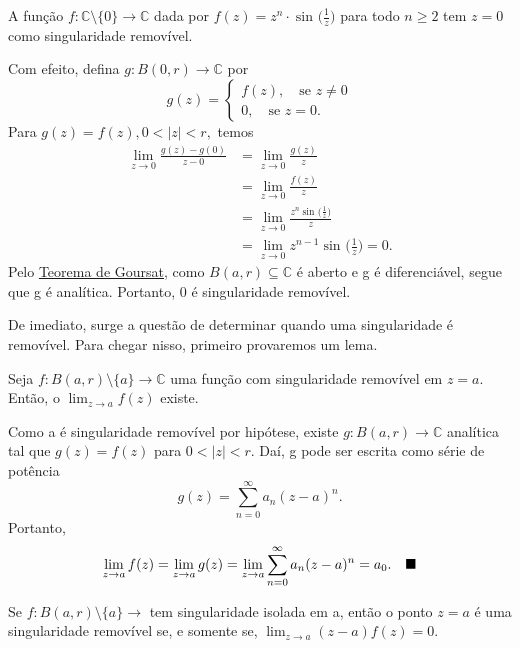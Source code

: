 \documentclass[ComplexAnalysis/complex.tex]{subfiles}
\begin{document}
\begin{example}
	A função \(f:\mathbb{C}\setminus{\{0\}}\rightarrow \mathbb{C}\) dada por \(f(z) = z^{n}\cdot \sin^{}{\biggl(\frac{1}{z}\biggr)}\) para todo \(n \geq 2\) tem
	\(z=0\) como singularidade removível.

	Com efeito, defina \(g:B(0, r)\rightarrow \mathbb{C}\) por
	\[
		g(z) = \left\{\begin{array}{ll}
			f(z),\quad \text{se }z\neq 0 \\
			0,\quad \text{se } z = 0.
		\end{array}\right.
	\]
	Para \(g(z) = f(z), 0 < |z| < r,\) temos
	\begin{align*}
		\lim_{z\to 0}\frac{g(z)-g(0)}{z-0} & = \lim_{z\to 0}\frac{g(z)}{z}                                    \\
		                                   & = \lim_{z\to 0}\frac{f(z)}{z}                                    \\
		                                   & = \lim_{z\to 0}\frac{z^{n}\sin^{}{\biggl(\frac{1}{z}\biggr)}}{z} \\
		                                   & = \lim_{z\to 0} z^{n-1}\sin^{}{\biggl(\frac{1}{z}\biggr)} = 0.
	\end{align*}
	Pelo \hyperlink{goursat}{Teorema de Goursat}, como \(B(a, r)\subseteq \mathbb{C}\) é aberto e g é diferenciável, segue que g é analítica.
	Portanto, 0 é singularidade removível.
\end{example}
De imediato, surge a questão de determinar quando uma singularidade é removível. Para chegar nisso, primeiro provaremos um lema.
\begin{lmm*}
	Seja \(f:B(a, r)\setminus{\{a\}}\rightarrow \mathbb{C}\) uma função com singularidade removível em \(z = a\). Então, o \(\lim_{z\to a}f(z)\) existe.
\end{lmm*}
\begin{proof*}
	Como a é singularidade removível por hipótese, existe \(g:B(a, r)\rightarrow \mathbb{C}\) analítica
	tal que \(g(z) = f(z)\) para \(0 < |z| < r.\) Daí, g pode ser escrita como série de potência
	\[
		g(z) = \sum\limits_{n=0}^{\infty}a_{n}(z-a)^{n}.
	\]
	Portanto,
	\[
		\lim_{z\to a}f(z) = \lim_{z\to a} g(z) = \lim_{z\to a}\sum\limits_{n=0}^{\infty}a_{n}(z-a)^{n} = a_{0}.\quad \text{$\blacksquare$}
	\]
\end{proof*}
\begin{theorem*}
	Se \(f:B(a, r)\setminus{\{a\}}\rightarrow \) tem singularidade isolada em a, então o ponto \(z=a\) é uma singularidade removível se, e somente se,
	\(\lim_{z\to a} (z-a)f(z) = 0.\)
\end{theorem*}
\end{document}
